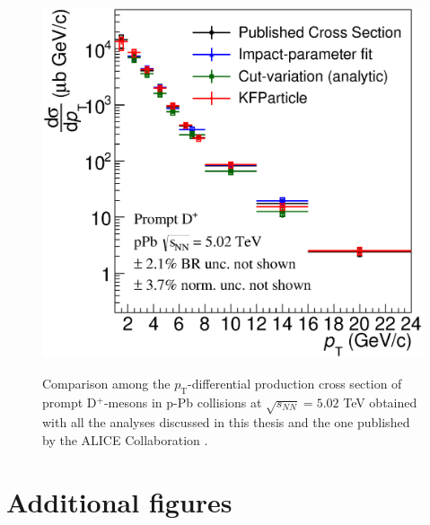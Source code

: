 \documentclass[b5paper,10pt,twoside,oldstyle,classica]{toptesi}
\newcommand{\pt}{p_\text{T}}
\begin{document}
\begin{figure}[tb]
\begin{center}
{\includegraphics[scale = 0.41]{CrossSecComp.eps}}
\caption{Comparison among the $\pt$-differential production cross section of prompt D$^+$-mesons in p-Pb collisions at $\sqrt{s_{NN}}=5.02$ TeV obtained with all the analyses discussed in this thesis and the one published by the ALICE Collaboration \cite{Abelev:2014hha}.}
\label{results_comp}
\end{center}
\end{figure} 
\appendix
\chapter{Additional figures}
\clearpage
\end{document}
